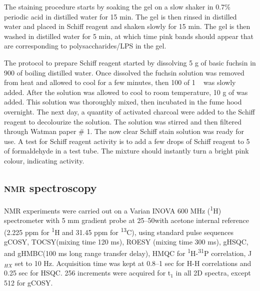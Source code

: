     The staining procedure starts by soaking the gel on a slow shaker in 0.7\% periodic acid in
    distilled water for 15 min. The gel is then rinsed in distilled water and placed in Schiff reagent
    and shaken slowly for 15 min. The gel is then washed in distilled water for 5 min, at which time
    pink bands should appear that are corresponding to polysaccharides/\ac{LPS} in the gel.

    The protocol to prepare Schiff reagent started by dissolving 5 \si{\gram} of basic fuchsin in
    900 \millilitre of boiling distilled water. Once dissolved the fuchsin solution was removed from
    heat and allowed to cool for a few minutes, then 100 \millilitre of 1 \si{\molar}\  was
    slowly added. After the solution was allowed to cool to room temperature, 10 \si{\gram} of
     was added. This solution was thoroughly mixed, then incubated in the fume hood
    overnight. The next day, a quantity of activated charcoal were added to the Schiff reagent to
    decolourize the solution. The solution was stirred and then filtered through Watman paper \# 1. The
    now clear Schiff stain solution was ready for use. 
 A test for Schiff reagent activity is
    to add a few drops of Schiff reagent to 5 \millilitre of formaldehyde in a test tube. The mixture
    should instantly turn a bright pink colour, indicating activity.

    \subsection{\textsc{nmr} spectroscopy} %
    \label{sub:nmr_spectroscopy}

    \Ac{NMR} experiments were carried out on a Varian INOVA 600 \si{\mega\hertz}
    (\textsuperscript{1}H) spectrometer with 5 \si{\milli\meter} gradient probe at 25--50\cel with
acetone internal reference (2.225 ppm for \textsuperscript{1}H and 31.45 ppm for
\textsuperscript{13}C), using standard pulse sequences \ac{gCOSY}, \ac{TOCSY}(mixing time 120
\si{\milli\second}), \ac{ROESY} (mixing time 300 \si{\milli\second}), \ac{gHSQC}, and
\ac{gHMBC}(100 \si{\milli\second} long range transfer delay), \ac{HMQC} for
\textsuperscript{1}H-\textsuperscript{31}P correlation, J$_{HX}$ set to 10
\si{\hertz}. Acquisition time was kept at 0.8--1 sec for H-H correlations and 0.25 sec for
\ac{HSQC}. 256 increments were acquired for t$_1$ in all 2D spectra, except 512 for \ac{gCOSY}.

